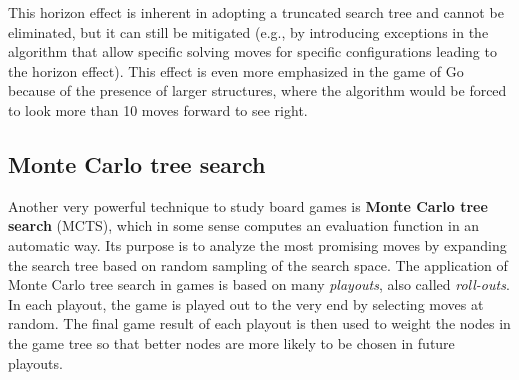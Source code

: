 This horizon effect is inherent in adopting a truncated search tree and cannot be eliminated, but it can still be mitigated (e.g., by introducing exceptions in the algorithm that allow specific solving moves for specific configurations leading to the horizon effect). This effect is even more emphasized in the game of Go because of the presence of larger structures, where the algorithm would be forced to look more than 10 moves forward to see right.
\subsection{Monte Carlo tree search}
Another very powerful technique to study board games is \textbf{Monte Carlo tree search} (MCTS), which in some sense computes an evaluation function in an automatic way. Its purpose is to analyze the most promising moves by expanding the search tree based on random sampling of the search space. The application of Monte Carlo tree search in games is based on many \emph{playouts}, also called \emph{roll-outs}. In each playout, the game is played out to the very end by selecting moves at random. The final game result of each playout is then used to weight the nodes in the game tree so that better nodes are more likely to be chosen in future playouts.

